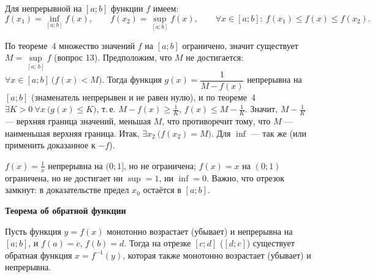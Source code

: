 \documentclass[a4paper,11pt]{article}
\newcommand{\podr}[1]{\par\needspace{8\baselineskip}\medskip
  {\large\bfseries\textcolor{oprc!80!black}{#1}}\par\nopagebreak\smallskip}
\begin{document}
Для непрерывной на $[a; b]$ функции $f$ имеем:
\[
  f(x_1) = \inf_{[a; b]} f(x), \qquad f(x_2) = \sup_{[a; b]} f(x), \qquad
  \forall x \in [a; b]\colon\ f(x_1) \le f(x) \le f(x_2).
\]

\begin{center}
\end{center}

\begin{dop}
По теореме~4 множество значений $f$ на $[a; b]$ ограничено, значит существует $M = \sup\limits_{[a;\,b]} f$ (вопрос 13).
Предположим, что $M$ не достигается: $\forall x \in [a; b]\ \bigl(f(x) < M\bigr)$. Тогда функция
$g(x) = \dfrac{1}{M - f(x)}$ непрерывна на $[a; b]$ (знаменатель непрерывен и не равен нулю), и по теореме~4
$\exists K > 0\ \forall x\ \bigl(g(x) \le K\bigr)$, т.\,е. $M - f(x) \ge \frac1K$, $f(x) \le M - \frac1K$.
Значит, $M - \frac1K$ --- верхняя граница значений, меньшая $M$, что противоречит тому, что $M$ --- наименьшая верхняя граница.
Итак, $\exists x_2\ \bigl(f(x_2) = M\bigr)$. Для $\inf$ --- так же (или применить доказанное к $-f$).
\end{dop}

\begin{dop}
$f(x) = \frac1x$ непрерывна на $(0; 1]$, но не ограничена; $f(x) = x$ на $(0; 1)$ ограничена, но не достигает
ни $\sup = 1$, ни $\inf = 0$. Важно, что отрезок замкнут: в доказательстве предел $x_0$ остаётся в $[a; b]$.
\end{dop}

\podr{Теорема об обратной функции}

\begin{teo}
Пусть функция $y = f(x)$ монотонно возрастает (убывает) и непрерывна на $[a; b]$, и $f(a) = c$, $f(b) = d$.
Тогда на отрезке $[c; d]$ ($[d; c]$) существует обратная функция $x = f^{-1}(y)$, которая также монотонно
возрастает (убывает) и непрерывна.
\end{teo}
\end{document}
